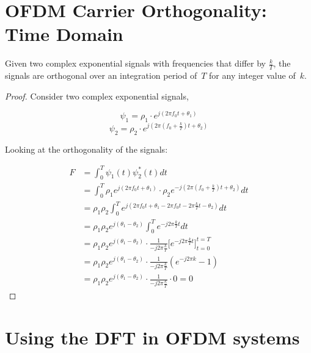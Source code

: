 \documentclass[class=report,11pt,crop=false]{standalone}
\begin{document}
\section{OFDM Carrier Orthogonality: Time Domain \label{sect:proofs_ofdm-time}}

    Given two complex exponential signals with frequencies that differ by \(\frac{k}{T}\), the signals are orthogonal over an integration period of~\(T\) for any integer value of~\(k\).

\begin{proof}
    Consider two complex exponential signals,
    
    \begin{equation}
        \psi_1 = \rho_1 \cdot e^{j(2\pi f_0 t + \theta_1)}
    \end{equation}
    \begin{equation}
        \psi_2 = \rho_2 \cdot e^{j(2\pi (f_0 + \frac{k}{T})t + \theta_2)}
    \end{equation}

    Looking at the orthogonality of the signals:
    
        \setlength{\jot}{10pt}
        \begin{align}
            F &= \int_0^T \psi_1(t) \psi_2^*(t) dt \\
            &= \int_0^T \rho_1 e^{j(2\pi f_0 t + \theta_1)} \cdot \rho_2 e^{-j(2\pi (f_0 + \frac{k}{T})t + \theta_2)} dt \\
            &= \rho_1 \rho_2 \int_0^T e^{j(2\pi f_0 t + \theta_1 - 2\pi f_0 t - 2\pi \frac{k}{T}t - \theta_2)} dt \\
            &= \rho_1 \rho_2 e^{j(\theta_1 - \theta_2)} \int_0^T e^{-j 2\pi \frac{k}{T} t} dt \\
            &= \rho_1 \rho_2 e^{j(\theta_1 - \theta_2)} \cdot \frac{1}{-j2\pi\frac{k}{T}} \bigg[ e^{-j2\pi\frac{k}{T} t} \bigg]^{t=T}_{t=0} \\
            &= \rho_1 \rho_2 e^{j(\theta_1 - \theta_2)} \cdot \frac{1}{-j2\pi\frac{k}{T}} (e^{-j2\pi k} - 1) \\
            &= \rho_1 \rho_2 e^{j(\theta_1 - \theta_2)} \cdot \frac{1}{-j2\pi\frac{k}{T}} \cdot 0 = 0
        \end{align}
    
\end{proof}

\section{Using the DFT in OFDM systems}


\ifstandalone
% 
\fi
\end{document}
